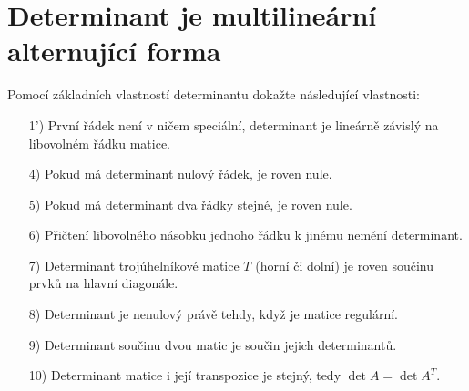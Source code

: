 \documentclass[12pt]{article}					%
\begin{document}
\section*{Determinant je multilineární alternující forma}
    \begin{priklad}[9.1]
        Pomocí základních vlastností determinantu dokažte následující vlastnosti:

        \begin{itemize}
            \item[1')] První řádek není v ničem speciální, determinant je lineárně závislý na libovolném řádku matice.
            \item[4)] Pokud má determinant nulový řádek, je roven nule.
            \item[5)] Pokud má determinant dva řádky stejné, je roven nule.
            \item[6)] Přičtení libovolného násobku jednoho řádku k jinému nemění determinant.
            \item[7)] Determinant trojúhelníkové matice $T$ (horní či dolní) je roven součinu prvků na hlavní diagonále.
            \item[8)] Determinant je nenulový právě tehdy, když je matice regulární.
            \item[9)] Determinant součinu dvou matic je součin jejich determinantů.
            \item[10)] Determinant matice i její transpozice je stejný, tedy $\det A = \det A^T$.
        \end{itemize}


\end{priklad}
\end{document}
